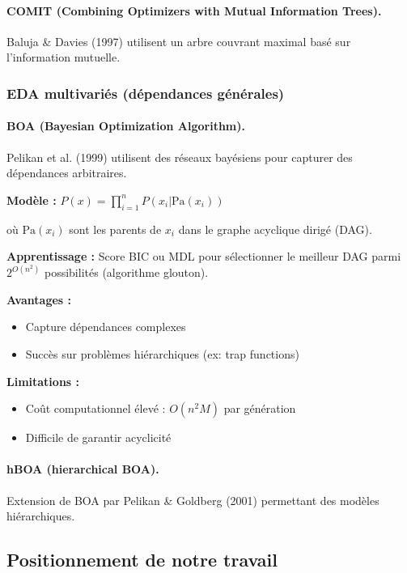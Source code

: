\documentclass[12pt,a4paper]{article}
\theoremstyle{definition}
\theoremstyle{remark}
\begin{document}
\paragraph{COMIT (Combining Optimizers with Mutual Information Trees).}
Baluja \& Davies (1997) \cite{baluja1997using} utilisent un arbre couvrant maximal basé sur l'information mutuelle.

\subsubsection{EDA multivariés (dépendances générales)}

\paragraph{BOA (Bayesian Optimization Algorithm).}
Pelikan et al. (1999) \cite{pelikan1999boa} utilisent des réseaux bayésiens pour capturer des dépendances arbitraires.

\textbf{Modèle :} $P(x) = \prod_{i=1}^n P(x_i | \text{Pa}(x_i))$

où $\text{Pa}(x_i)$ sont les parents de $x_i$ dans le graphe acyclique dirigé (DAG).

\textbf{Apprentissage :} Score BIC ou MDL pour sélectionner le meilleur DAG parmi $2^{O(n^2)}$ possibilités (algorithme glouton).

\textbf{Avantages :}
\begin{itemize}
    \item Capture dépendances complexes
    \item Succès sur problèmes hiérarchiques (ex: trap functions)
\end{itemize}

\textbf{Limitations :}
\begin{itemize}
    \item Coût computationnel élevé : $O(n^2 M)$ par génération
    \item Difficile de garantir acyclicité
\end{itemize}

\paragraph{hBOA (hierarchical BOA).}
Extension de BOA par Pelikan \& Goldberg (2001) \cite{pelikan2001escaping} permettant des modèles hiérarchiques.

\subsection{Positionnement de notre travail}
\end{document}
